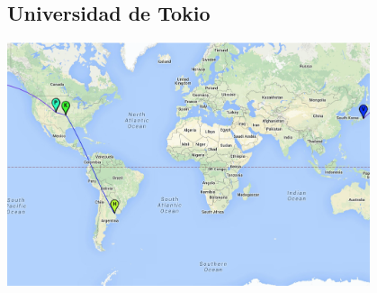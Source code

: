 \subsection{Universidad de Tokio}
\centerline{\includegraphics[width=0.8\textwidth]{mapas/Japon.png}}


